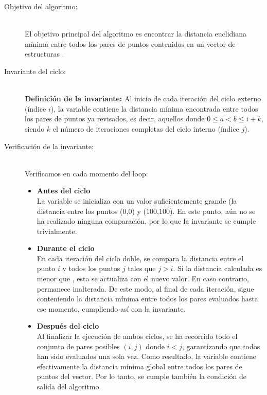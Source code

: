 \documentclass[informe.tex]{subfiles}
\begin{document}
\begin{description}
	\item[Objetivo del algoritmo:] ~\\
	      El objetivo principal del algoritmo es encontrar la distancia euclidiana mínima entre todos
	      los pares de puntos contenidos en un vector de estructuras .

	\item[Invariante del ciclo:] ~\\
	      \textbf{Definición de la invariante:} Al inicio de cada iteración del ciclo externo (índice
	      $i$), la variable  contiene la distancia mínima encontrada entre todos los
	      pares de puntos ya revisados, es decir, aquellos donde $0 \leq a < b \leq i + k$, siendo $k$
	      el número de iteraciones completas del ciclo interno (índice $j$).

	\item[Verificación de la invariante:] ~\\
	      Verificamos en cada momento del loop:

	      \begin{itemize}
		      \item \textbf{Antes del ciclo} \\
		            La variable  se inicializa con un valor suficientemente grande (la
		            distancia entre los puntos (0,0) y (100,100). En este punto, aún no se ha realizado
		            ninguna comparación, por lo que la invariante se cumple trivialmente.

		      \item \textbf{Durante el ciclo} \\
		            En cada iteración del ciclo doble, se compara la distancia entre el punto $i$ y
		            todos los puntos $j$ tales que $j > i$. Si la distancia calculada es menor que
		            , esta se actualiza con el nuevo valor. En caso contrario,
		             permanece inalterada. De este modo, al final de cada iteración,
		             sigue conteniendo la distancia mínima entre todos los pares
		            evaluados hasta ese momento, cumpliendo así con la invariante.

		      \item \textbf{Después del ciclo} \\
		            Al finalizar la ejecución de ambos ciclos, se ha recorrido todo el conjunto de pares
		            posibles $(i, j)$ donde $i < j$, garantizando que todos han sido evaluados una sola
		            vez. Como resultado, la variable  contiene efectivamente la
		            distancia mínima global entre todos los pares de puntos del vector. Por lo tanto, se
		            cumple también la condición de salida del algoritmo.
	      \end{itemize}


\end{description}
\end{document}
